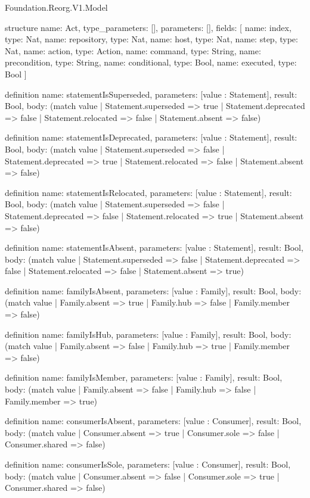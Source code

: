 \begin{lexlean}{Foundation.Reorg.V1.Model}
\begin{semanticmodule}
structure{
  name: Act,
  type_parameters: [],
  parameters: [],
  fields: [
    {name: index, type: Nat},
    {name: repository, type: Nat},
    {name: host, type: Nat},
    {name: step, type: Nat},
    {name: action, type: Action},
    {name: command, type: String},
    {name: precondition, type: String},
    {name: conditional, type: Bool},
    {name: executed, type: Bool}
  ]
}

definition{
  name: statementIsSuperseded,
  parameters: [value : Statement],
  result: Bool,
  body: (match value
    | Statement.superseded => true
    | Statement.deprecated => false
    | Statement.relocated => false
    | Statement.absent => false)
}

definition{
  name: statementIsDeprecated,
  parameters: [value : Statement],
  result: Bool,
  body: (match value
    | Statement.superseded => false
    | Statement.deprecated => true
    | Statement.relocated => false
    | Statement.absent => false)
}

definition{
  name: statementIsRelocated,
  parameters: [value : Statement],
  result: Bool,
  body: (match value
    | Statement.superseded => false
    | Statement.deprecated => false
    | Statement.relocated => true
    | Statement.absent => false)
}

definition{
  name: statementIsAbsent,
  parameters: [value : Statement],
  result: Bool,
  body: (match value
    | Statement.superseded => false
    | Statement.deprecated => false
    | Statement.relocated => false
    | Statement.absent => true)
}

definition{
  name: familyIsAbsent,
  parameters: [value : Family],
  result: Bool,
  body: (match value | Family.absent => true | Family.hub => false | Family.member => false)
}

definition{
  name: familyIsHub,
  parameters: [value : Family],
  result: Bool,
  body: (match value | Family.absent => false | Family.hub => true | Family.member => false)
}

definition{
  name: familyIsMember,
  parameters: [value : Family],
  result: Bool,
  body: (match value | Family.absent => false | Family.hub => false | Family.member => true)
}

definition{
  name: consumerIsAbsent,
  parameters: [value : Consumer],
  result: Bool,
  body: (match value | Consumer.absent => true | Consumer.sole => false | Consumer.shared => false)
}

definition{
  name: consumerIsSole,
  parameters: [value : Consumer],
  result: Bool,
  body: (match value | Consumer.absent => false | Consumer.sole => true | Consumer.shared => false)
}


\end{semanticmodule}
\end{lexlean}
